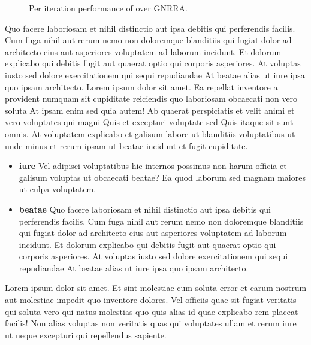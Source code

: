 \begin{figure}
\begin{minipage}{0.48\textwidth}
    \end{minipage}
    \caption{Per iteration performance of \mytool{} over GNRRA.}
    \label{fig:per-iteration-example}

\end{figure}

Quo facere laboriosam et nihil distinctio aut ipsa debitis qui perferendis facilis. Cum fuga nihil aut rerum nemo non doloremque blanditiis qui fugiat dolor ad architecto eius aut asperiores voluptatem ad laborum incidunt. Et dolorum explicabo qui debitis fugit aut quaerat optio qui corporis asperiores. At voluptas iusto sed dolore exercitationem qui sequi repudiandae At beatae alias ut iure ipsa quo ipsam architecto.
Lorem ipsum dolor sit amet. Ea repellat inventore a provident numquam sit cupiditate reiciendis quo laboriosam obcaecati non vero soluta At ipsam enim sed quia autem! Ab quaerat perspiciatis et velit animi et vero voluptates qui magni Quis et excepturi voluptate sed Quis itaque sit sunt omnis. At voluptatem explicabo et galisum labore ut blanditiis voluptatibus ut unde minus et rerum ipsam ut beatae incidunt et fugit cupiditate.

\begin{itemize}
    \item[] {\bf iure} Vel adipisci voluptatibus hic internos possimus non harum officia et galisum voluptas ut obcaecati beatae? Ea quod laborum sed magnam maiores ut culpa voluptatem.

    \item[] {\bf beatae} Quo facere laboriosam et nihil distinctio aut ipsa debitis qui perferendis facilis. Cum fuga nihil aut rerum nemo non doloremque blanditiis qui fugiat dolor ad architecto eius aut asperiores voluptatem ad laborum incidunt. Et dolorum explicabo qui debitis fugit aut quaerat optio qui corporis asperiores. At voluptas iusto sed dolore exercitationem qui sequi repudiandae At beatae alias ut iure ipsa quo ipsam architecto.

\end{itemize}



Lorem ipsum dolor sit amet. Et sint molestiae cum soluta error et earum nostrum aut molestiae impedit quo inventore dolores. Vel officiis quae sit fugiat veritatis qui soluta vero qui natus molestias quo quis alias id quae explicabo rem placeat facilis! Non alias voluptas non veritatis quas qui voluptates ullam et rerum iure ut neque excepturi qui repellendus sapiente. 

